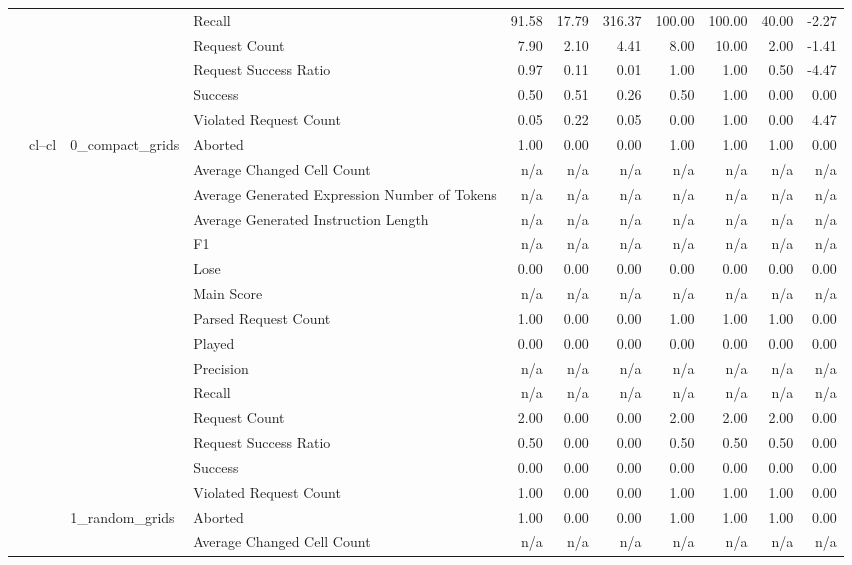 \begin{tabular}{llllrrrrrrr}
 &  &  & Recall & 91.58 & 17.79 & 316.37 & 100.00 & 100.00 & 40.00 & -2.27 \\
 &  &  & Request Count & 7.90 & 2.10 & 4.41 & 8.00 & 10.00 & 2.00 & -1.41 \\
 &  &  & Request Success Ratio & 0.97 & 0.11 & 0.01 & 1.00 & 1.00 & 0.50 & -4.47 \\
 &  &  & Success & 0.50 & 0.51 & 0.26 & 0.50 & 1.00 & 0.00 & 0.00 \\
 &  &  & Violated Request Count & 0.05 & 0.22 & 0.05 & 0.00 & 1.00 & 0.00 & 4.47 \\
\cline{2-11} \cline{3-11}
 & \multirow[t]{30}{*}{cl--cl} & \multirow[t]{15}{*}{0_compact_grids} & Aborted & 1.00 & 0.00 & 0.00 & 1.00 & 1.00 & 1.00 & 0.00 \\
 &  &  & Average Changed Cell Count & n/a & n/a & n/a & n/a & n/a & n/a & n/a \\
 &  &  & Average Generated Expression Number of Tokens & n/a & n/a & n/a & n/a & n/a & n/a & n/a \\
 &  &  & Average Generated Instruction Length & n/a & n/a & n/a & n/a & n/a & n/a & n/a \\
 &  &  & F1 & n/a & n/a & n/a & n/a & n/a & n/a & n/a \\
 &  &  & Lose & 0.00 & 0.00 & 0.00 & 0.00 & 0.00 & 0.00 & 0.00 \\
 &  &  & Main Score & n/a & n/a & n/a & n/a & n/a & n/a & n/a \\
 &  &  & Parsed Request Count & 1.00 & 0.00 & 0.00 & 1.00 & 1.00 & 1.00 & 0.00 \\
 &  &  & Played & 0.00 & 0.00 & 0.00 & 0.00 & 0.00 & 0.00 & 0.00 \\
 &  &  & Precision & n/a & n/a & n/a & n/a & n/a & n/a & n/a \\
 &  &  & Recall & n/a & n/a & n/a & n/a & n/a & n/a & n/a \\
 &  &  & Request Count & 2.00 & 0.00 & 0.00 & 2.00 & 2.00 & 2.00 & 0.00 \\
 &  &  & Request Success Ratio & 0.50 & 0.00 & 0.00 & 0.50 & 0.50 & 0.50 & 0.00 \\
 &  &  & Success & 0.00 & 0.00 & 0.00 & 0.00 & 0.00 & 0.00 & 0.00 \\
 &  &  & Violated Request Count & 1.00 & 0.00 & 0.00 & 1.00 & 1.00 & 1.00 & 0.00 \\
\cline{3-11}
 &  & \multirow[t]{15}{*}{1_random_grids} & Aborted & 1.00 & 0.00 & 0.00 & 1.00 & 1.00 & 1.00 & 0.00 \\
 &  &  & Average Changed Cell Count & n/a & n/a & n/a & n/a & n/a & n/a & n/a \\

\end{tabular}
